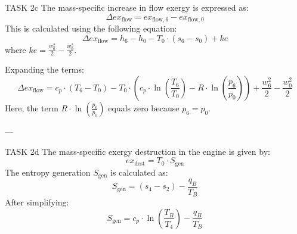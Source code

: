 TASK 2c  
The mass-specific increase in flow exergy is expressed as:  
\[
\Delta ex_{\text{flow}} = ex_{\text{flow},6} - ex_{\text{flow},0}
\]  
This is calculated using the following equation:  
\[
\Delta ex_{\text{flow}} = h_6 - h_0 - T_0 \cdot (s_6 - s_0) + ke
\]  
where \( ke = \frac{w_6^2}{2} - \frac{w_0^2}{2} \).  

Expanding the terms:  
\[
\Delta ex_{\text{flow}} = c_p \cdot (T_6 - T_0) - T_0 \cdot \left( c_p \cdot \ln \left( \frac{T_6}{T_0} \right) - R \cdot \ln \left( \frac{p_6}{p_0} \right) \right) + \frac{w_6^2}{2} - \frac{w_0^2}{2}
\]  
Here, the term \( R \cdot \ln \left( \frac{p_6}{p_0} \right) \) equals zero because \( p_6 = p_0 \).  

---

TASK 2d  
The mass-specific exergy destruction in the engine is given by:  
\[
ex_{\text{dest}} = T_0 \cdot S_{\text{gen}}
\]  
The entropy generation \( S_{\text{gen}} \) is calculated as:  
\[
S_{\text{gen}} = (s_4 - s_2) - \frac{q_B}{T_B}
\]  
After simplifying:  
\[
S_{\text{gen}} = c_p \cdot \ln \left( \frac{T_B}{T_4} \right) - \frac{q_B}{T_B}
\]